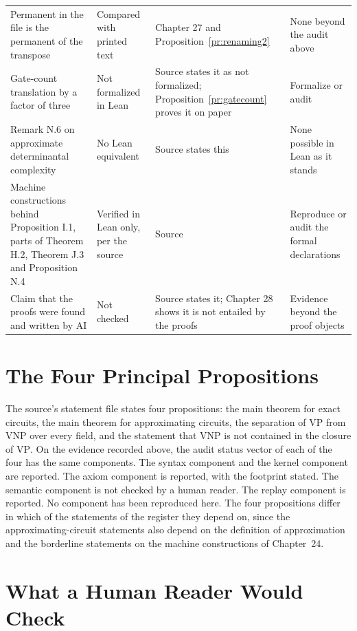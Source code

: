\documentclass[11pt,letterpaper]{report}
\theoremstyle{plain}
\theoremstyle{definition}
\theoremstyle{remark}
\newcommand{\VP}{\mathrm{VP}}
\newcommand{\VNP}{\mathrm{VNP}}
\begin{document}
\begin{longtable}{>{\raggedright\arraybackslash}p{}>{\raggedright\arraybackslash}p{}>{\raggedright\arraybackslash}p{}>{\raggedright\arraybackslash}p{}}
Permanent in the file is the permanent of the transpose & Compared with printed text & Chapter 27 and Proposition~\ref{pr:renaming2} & None beyond the audit above\\
Gate-count translation by a factor of three & Not formalized in Lean & Source states it as not formalized; Proposition~\ref{pr:gatecount} proves it on paper & Formalize or audit\\
Remark N.6 on approximate determinantal complexity & No Lean equivalent & Source states this & None possible in Lean as it stands\\
Machine constructions behind Proposition I.1, parts of Theorem H.2, Theorem J.3 and Proposition N.4 & Verified in Lean only, per the source & Source & Reproduce or audit the formal declarations\\
Claim that the proofs were found and written by AI & Not checked & Source states it; Chapter 28 shows it is not entailed by the proofs & Evidence beyond the proof objects\\
\hline
\end{longtable}

\section{The Four Principal Propositions}

The source's statement file states four propositions: the main theorem for exact circuits, the main theorem for approximating circuits, the separation of $\VP$ from $\VNP$ over every field, and the statement that $\VNP$ is not contained in the closure of $\VP$. On the evidence recorded above, the audit status vector of each of the four has the same components. The syntax component and the kernel component are reported. The axiom component is reported, with the footprint stated. The semantic component is not checked by a human reader. The replay component is reported. No component has been reproduced here. The four propositions differ in which of the statements of the register they depend on, since the approximating-circuit statements also depend on the definition of approximation and the borderline statements on the machine constructions of Chapter~24.

\section{What a Human Reader Would Check}
\end{document}
